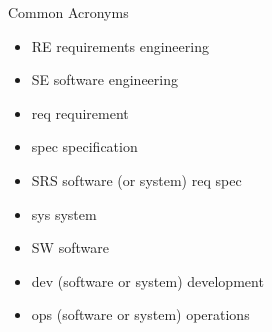 
\begin{Slide}{Common Acronyms}

\begin{itemize}
\item RE   \hfill requirements engineering
\item SE   \hfill software engineering
\item req \hfill requirement 
\item spec \hfill specification
\item SRS  \hfill software (or system) req spec
\item sys  \hfill system
\item SW   \hfill software
\item dev  \hfill (software or system) development
\item ops  \hfill (software or system) operations


\end{itemize}
\end{Slide}